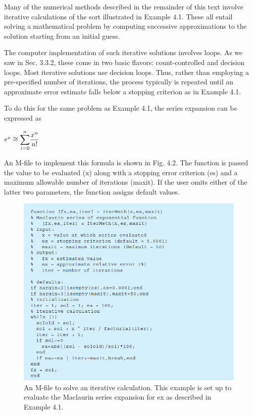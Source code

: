 \documentclass[../main.tex]{subfiles}
\begin{document}
\noindent
Many of the numerical methods described in the remainder of this text involve iterative
calculations of the sort illustrated in Example 4.1. These all entail solving a mathematical
problem by computing successive approximations to the solution starting from an initial
guess.

The computer implementation of such iterative solutions involves loops. As we saw in
Sec. 3.3.2, these come in two basic flavors: count-controlled and decision loops. Most iterative
solutions use decision loops. Thus, rather than employing a pre-specified number of
iterations, the process typically is repeated until an approximate error estimate falls below
a stopping criterion as in Example 4.1.

To do this for the same problem as Example 4.1, the series expansion can be expressed
as
\newline

$e^x\cong \mathlarger{\sum}_{i=0}^{n}\dfrac{x^n}{n!}$
\newline

\noindent
An M-file to implement this formula is shown in Fig. 4.2. The function is passed the value
to be evaluated (x) along with a stopping error criterion (es) and a maximum allowable
number of iterations (maxit). If the user omits either of the latter two parameters, the function
assigns default values.
\newline

\begin{figure}[h]
    \includegraphics{./images/fig_4_2}
    \caption{An M-file to solve an iterative calculation. This example is set up to evaluate the Maclaurin series
    expansion for ex as described in Example 4.1.}
\end{figure}
\end{document}

